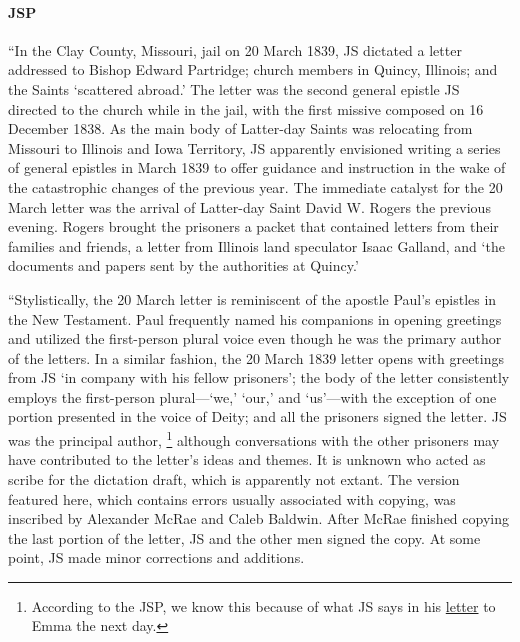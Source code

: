 		\paragraph{JSP}
	
			``In the Clay County, Missouri, jail on 20 March 1839, JS dictated a letter addressed to Bishop Edward Partridge; church members in Quincy, Illinois; and the Saints `scattered abroad.' The letter was the second general epistle JS directed to the church while in the jail, with the first missive composed on 16 December 1838. As the main body of Latter-day Saints was relocating from Missouri to Illinois and Iowa Territory, JS apparently envisioned writing a series of general epistles in March 1839 to offer guidance and instruction in the wake of the catastrophic changes of the previous year. The immediate catalyst for the 20 March letter was the arrival of Latter-day Saint David W. Rogers the previous evening. Rogers brought the prisoners a packet that contained letters from their families and friends, a letter from Illinois land speculator Isaac Galland, and `the documents and papers sent by the authorities at Quincy.'
			
			``Stylistically, the 20 March letter is reminiscent of the apostle Paul's epistles in the New Testament. Paul frequently named his companions in opening greetings and utilized the first-person plural voice even though he was the primary author of the letters. In a similar fashion, the 20 March 1839 letter opens with greetings from JS `in company with his fellow prisoners'; the body of the letter consistently employs the first-person plural---`we,' `our,' and `us'---with the exception of one portion presented in the voice of Deity; and all the prisoners signed the letter. JS was the principal author,%
				\footnote{%
					According to the JSP, we know this because of what JS says in his \hyperref[EMS-1839-JS-21-MAR-1839]{letter} to Emma the next day.
					}
			although conversations with the other prisoners may have contributed to the letter's ideas and themes. It is unknown who acted as scribe for the dictation draft, which is apparently not extant. The version featured here, which contains errors usually associated with copying, was inscribed by Alexander McRae and Caleb Baldwin. After McRae finished copying the last portion of the letter, JS and the other men signed the copy. At some point, JS made minor corrections and additions.
			
